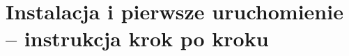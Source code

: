 \chapter{Instalacja i pierwsze uruchomienie -- instrukcja krok po kroku}
\label{cha:instalacjaIPierwszeUruchomienie}


